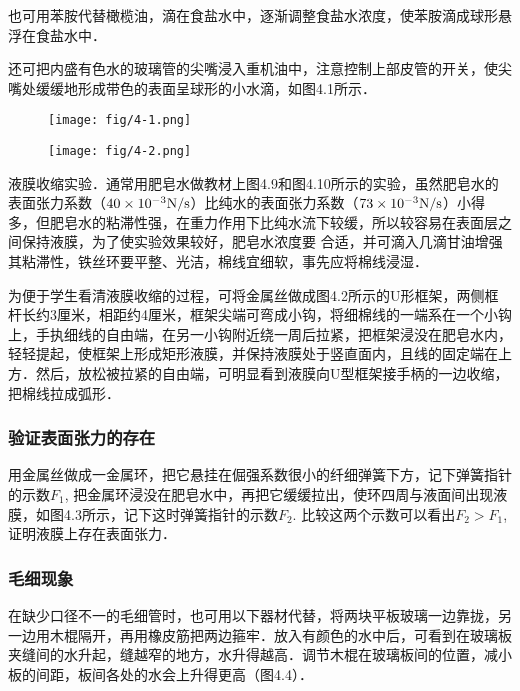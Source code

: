 也可用苯胺代替橄榄油，滴在食盐水中，逐渐调整食盐水浓度，使苯胺滴成球形悬浮在食盐水中．

还可把内盛有色水的玻璃管的尖嘴浸入重机油中，注意控制上部皮管的开关，使尖嘴处缓缓地形成带色的表面呈球形的小水滴，如图4.1所示．
\begin{figure}[htp]\centering
    \begin{minipage}[t]{0.48\textwidth}
    \centering
\texttt{[image: fig/4-1.png]}
    \caption{}
    \end{minipage}
    \begin{minipage}[t]{0.48\textwidth}
    \centering
\texttt{[image: fig/4-2.png]}
    \caption{}
    \end{minipage}
    \end{figure}

液膜收缩实验．通常用肥皂水做教材上图4.9和图4.10所示的实验，虽然肥皂水的表面张力系数（$40\times10^{-3}{\rm N/s}$）比纯水的表面张力系数（$73\times10^{-3}{\rm N/s}$）小得多，但肥皂水的粘滞性强，在重力作用下比纯水流下较缓，所以较容易在表面层之间保持液膜，为了使实验效果较好，肥皂水浓度要
合适，并可滴入几滴甘油增强其粘滞性，铁丝环要平整、光洁，棉线宜细软，事先应将棉线浸湿．

为便于学生看清液膜收缩的过程，可将金属丝做成图4.2所示的U形框架，两侧框杆长约3厘米，相距约4厘米，框架尖端可弯成小钩，将细棉线的一端系在一个小钩上，手执细线的自由端，在另一小钩附近绕一周后拉紧，把框架浸没在肥皂水内，轻轻提起，使框架上形成矩形液膜，并保持液膜处于竖直面内，且线的固定端在上方．然后，放松被拉紧的自由端，可明显看到液膜向U型框架接手柄的一边收缩，把棉线拉成弧形．



\subsubsection{验证表面张力的存在}

用金属丝做成一金属环，把它悬挂在倔强系数很小的纤细弹簧下方，记下弹簧指针的示数$F_1$, 把金属环浸没在肥皂水中，再把它缓缓拉出，使环四周与液面间出现液膜，如图4.3所示，记下这时弹簧指针的示数$F_2$. 比较这两个示数可以看出$F_2>F_1$, 证明液膜上存在表面张力．

\subsubsection{毛细现象}

在缺少口径不一的毛细管时，也可用以下器材代替，将两块平板玻璃一边靠拢，另一边用木棍隔开，再用橡皮筋把两边箍牢．放入有颜色的水中后，可看到在玻璃板夹缝间的水升起，缝越窄的地方，水升得越高．调节木棍在玻璃板间的位置，减小板的间距，板间各处的水会上升得更高（图4.4）．

